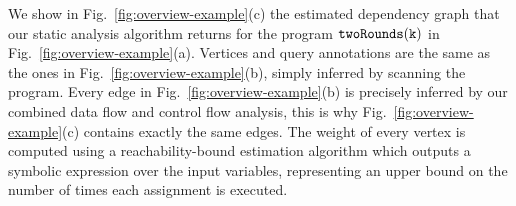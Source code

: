  
%
We show in Fig.~\ref{fig:overview-example}(c) the estimated dependency graph that our static analysis algorithm returns for the program $\mathtt{twoRounds(k)}$ in Fig.~\ref{fig:overview-example}(a).
Vertices and query annotations are the same as the ones in Fig.~\ref{fig:overview-example}(b), simply inferred by scanning the program.
 Every edge in Fig.~\ref{fig:overview-example}(b) is precisely inferred by our combined data flow and control flow analysis, this is why Fig.~\ref{fig:overview-example}(c) contains exactly the same edges.
The weight of every vertex is computed using a reachability-bound estimation algorithm which outputs a symbolic expression over the input variables, representing an upper bound on the number of times each assignment is executed.
